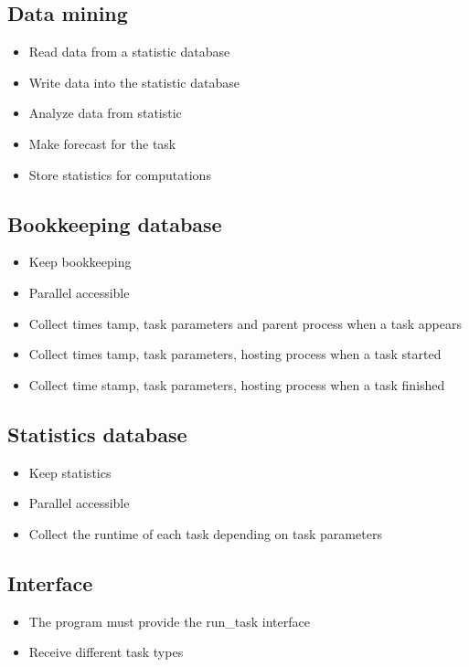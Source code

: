 {	
	\subsection{Data mining}
	
		\begin{itemize}
			\item Read data from a statistic database
			\item Write data into the statistic database
			\item Analyze data from statistic
			\item Make forecast for the task
			\item Store statistics for computations
		\end{itemize}
	
	
	\subsection{Bookkeeping database}
	
		\begin{itemize}
			\item Keep bookkeeping
			\item Parallel accessible
			\item Collect times tamp, task parameters and parent process when a task appears
			\item Collect times tamp, task parameters, hosting process when a task started
			\item Collect time stamp, task parameters, hosting process when a task finished
		\end{itemize}
	
	
	\subsection{Statistics database}
	
		\begin{itemize}
			\item Keep statistics
			\item Parallel accessible
			\item Collect the runtime of each task depending on task parameters
		\end{itemize}
	
	
	\subsection{Interface}
	
		\begin{itemize}
			\item The program must provide the run\_task interface
			\item Receive different task types
		\end{itemize}
		
}
